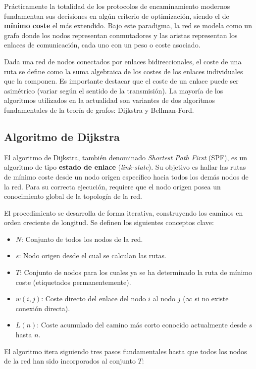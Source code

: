 Prácticamente la totalidad de los protocolos de encaminamiento modernos fundamentan sus decisiones en algún criterio de optimización, siendo el de \textbf{mínimo coste} el más extendido. Bajo este paradigma, la red se modela como un grafo donde los nodos representan conmutadores y las aristas representan los enlaces de comunicación, cada uno con un peso o coste asociado.

Dada una red de nodos conectados por enlaces bidireccionales, el coste de una ruta se define como la suma algebraica de los costes de los enlaces individuales que la componen. Es importante destacar que el coste de un enlace puede ser asimétrico (variar según el sentido de la transmisión). La mayoría de los algoritmos utilizados en la actualidad son variantes de dos algoritmos fundamentales de la teoría de grafos: Dijkstra y Bellman-Ford.

\subsection{Algoritmo de Dijkstra}

El algoritmo de Dijkstra, también denominado \textit{Shortest Path First} (SPF), es un algoritmo de tipo \textbf{estado de enlace} (\textit{link-state}). Su objetivo es hallar las rutas de mínimo coste desde un nodo origen específico hacia todos los demás nodos de la red. Para su correcta ejecución, requiere que el nodo origen posea un conocimiento global de la topología de la red.

El procedimiento se desarrolla de forma iterativa, construyendo los caminos en orden creciente de longitud. Se definen los siguientes conceptos clave:

\begin{itemize}
	\item $N$: Conjunto de todos los nodos de la red.
	\item $s$: Nodo origen desde el cual se calculan las rutas.
	\item $T$: Conjunto de nodos para los cuales ya se ha determinado la ruta de mínimo coste (etiquetados permanentemente).
	\item $w(i,j)$: Coste directo del enlace del nodo $i$ al nodo $j$ ($ \infty $ si no existe conexión directa).
	\item $L(n)$: Coste acumulado del camino más corto conocido actualmente desde $s$ hasta $n$.
\end{itemize}

El algoritmo itera siguiendo tres pasos fundamentales hasta que todos los nodos de la red han sido incorporados al conjunto $T$:

